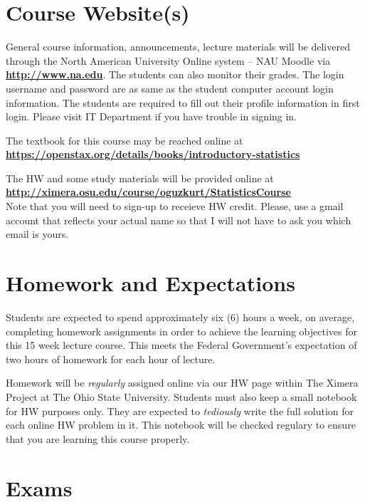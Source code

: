 \documentclass[handout]{ximera}
\begin{document}
\section*{Course Website(s)}

General course information, announcements, lecture materials will be delivered through the North American University Online system – NAU Moodle via \href{http://www.na.edu}{\bf http://www.na.edu}. The students can also monitor their grades. The login username and password are as same as the student computer account login information. The students are required to fill out their profile information in first login. Please visit IT Department if you have trouble in signing in.

The textbook for this course may be reached online at 
\\ 
\href{https://openstax.org/details/books/introductory-statistics}{\bf https://openstax.org/details/books/introductory-statistics}

The HW and some study materials will be provided online at 
\\ 
\href{http://ximera.osu.edu/course/oguzkurt/StatisticsCourse}{\bf http://ximera.osu.edu/course/oguzkurt/StatisticsCourse} 
\\
Note that you will need to sign-up to receieve HW credit. Please, use a gmail account that reflects your actual name so that I will not have to ask you which email is yours.

\section*{Homework and Expectations}

Students are expected to spend approximately six (6) hours a week, on average, completing homework assignments in order to achieve the learning objectives for this 15 week lecture course. This meets the Federal Government’s expectation of two hours of homework for each hour of lecture. 

Homework will be {\it regularly} assigned online via our HW page within The Ximera Project at The Ohio State University. Students must also keep a small notebook for HW purposes only. They are expected to {\it tediously} write the full solution for each online HW problem in it. This notebook will be checked regulary to ensure that you are learning this course properly. 

\section*{Exams}
\end{document}
